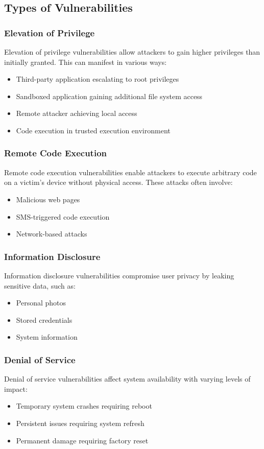 \documentclass{article}
\begin{document}
\subsection{Types of Vulnerabilities}
\subsubsection{Elevation of Privilege}
Elevation of privilege vulnerabilities allow attackers to gain higher privileges than initially granted. This can manifest in various ways:
\begin{itemize}
    \item Third-party application escalating to root privileges
    \item Sandboxed application gaining additional file system access
    \item Remote attacker achieving local access
    \item Code execution in trusted execution environment
\end{itemize}

\subsubsection{Remote Code Execution}
Remote code execution vulnerabilities enable attackers to execute arbitrary code on a victim's device without physical access. These attacks often involve:
\begin{itemize}
    \item Malicious web pages
    \item SMS-triggered code execution
    \item Network-based attacks
\end{itemize}

\subsubsection{Information Disclosure}
Information disclosure vulnerabilities compromise user privacy by leaking sensitive data, such as:
\begin{itemize}
    \item Personal photos
    \item Stored credentials
    \item System information
\end{itemize}

\subsubsection{Denial of Service}
Denial of service vulnerabilities affect system availability with varying levels of impact:
\begin{itemize}
    \item Temporary system crashes requiring reboot
    \item Persistent issues requiring system refresh
    \item Permanent damage requiring factory reset
\end{itemize}
\end{document}

